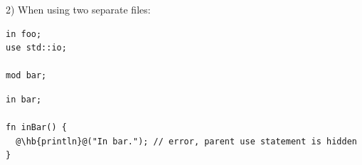 2) When using two separate files:

\hspace{-0.03\linewidth}%
\begin{minipage}[t][][t]{0.3\linewidth}%
\begin{lstlisting}[caption=\textit{./foo.yr}, style=coloredverbatim]
in foo;
use std::io;

mod bar;
\end{lstlisting}
\end{minipage}%
\hspace{0.02\linewidth}%
\begin{minipage}[t][][t]{0.65\linewidth}
\begin{lstlisting}[caption=\textit{./foo/bar.yr}, style=coloredverbatimError, escapechar=@]
in bar;

fn inBar() {
  @\hb{println}@("In bar."); // error, parent use statement is hidden
}
\end{lstlisting}
\end{minipage}%

\vfill%
\pagebreak
